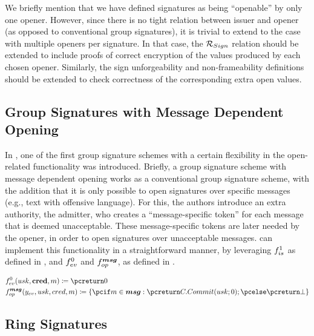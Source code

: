 We briefly mention that we have defined \UAS signatures as being ``openable'' by
only one opener. However, since there is no tight relation between issuer and
opener (as opposed to conventional group signatures), it is trivial to
extend to the case with multiple openers per signature. In that case, the
$\mathcal{R}_{Sign}$ relation should be extended to include proofs of correct
encryption of the \yinsp values produced by each chosen opener.
Similarly, the sign unforgeability and non-frameability definitions should be
extended to check correctness of the corresponding extra open values.

\subsection{Group Signatures with Message Dependent Opening}
\label{ssec:uas-gsmdo}

In \cite{khk+19}, one of the first group signature schemes with a certain
flexibility in the open-related functionality was introduced. Briefly, a group
signature scheme with message dependent opening works as a conventional group
signature scheme, with the addition that it is only possible to open signatures
over specific messages (e.g., text with offensive language). For this, the
authors introduce an extra authority, the admitter, who creates a
``message-specific token'' for each message that is deemed unacceptable.
These message-specific tokens are later needed by the opener, in order to open
signatures over unacceptable messages. \UAS can implement this functionality in
a straightforward manner, by leveraging $f_{is}^1$ as defined in
, and $f_{ev}^0$ and $f_{op}^{\boldsymbol{msg}}$, as defined in
.

\begin{align}
  & \feval^0(\usk,\scred,\msg) \coloneqq \pcreturn 0 \nonumber \\
  & \finsp^{\smsg}(\yeval,\usk,\cred,\msg) \coloneqq \lbrace \pcif \msg \in \smsg:
    \pcreturn \CCommit(\usk;0); \pcelse \pcreturn \bot \rbrace
    \label{eq:uas-gsmdo-funcs}
\end{align}


\subsection{Ring Signatures}
\label{ssec:uas-ring}

